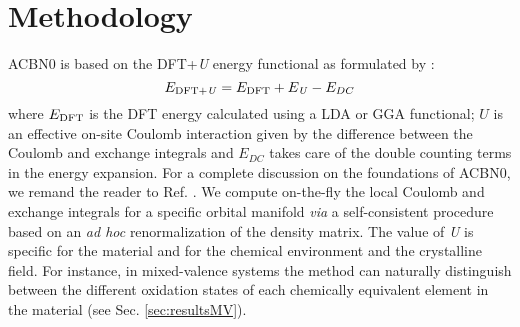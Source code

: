 \documentclass[12pt,a4paper,final]{iopart}
\begin{document}
\section{Methodology}
\label{sec:methods}

ACBN0 is based on the DFT+\textit{U} energy functional as formulated by \cite{dudarev1998electron}:
\begin{equation*}
E_{\rm{DFT}+\it{U}}=E_{\rm{DFT}} + E_{\it U} -E_{DC}
\end{equation*}
where $E_{\rm{DFT}}$ is the DFT energy calculated using a LDA or GGA functional; $\textit{U}$ is an effective on-site Coulomb interaction given by the difference between the Coulomb and exchange integrals  and $E_{DC}$ takes care of the double counting terms in the energy expansion. For a complete discussion on the foundations of ACBN0, we remand the reader to Ref. \cite{agapito2015reformulation,gopal2015improved}. We compute on-the-fly the local Coulomb  and exchange  integrals for a specific orbital manifold \textit{via} a self-consistent procedure based on an \textit{ad hoc} renormalization of the density matrix. The value of \textit{U} is specific for the material and for the chemical environment and the crystalline field. For instance, in mixed-valence systems the method can naturally distinguish between the different oxidation states of each chemically equivalent element  in the material (see Sec. \ref{sec:resultsMV}). 
\end{document}
